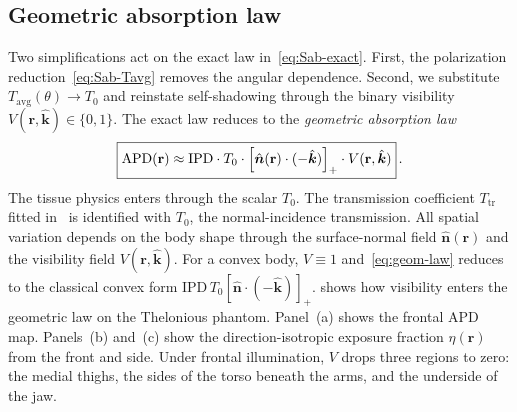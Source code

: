 \documentclass[journal,twocolumn,10pt]{IEEEtran}
\newcommand{\khat}{\hat{\bm{k}}}
\newcommand{\nhat}{\hat{\bm{n}}}
\newcommand{\rr}{\mathbf{r}}
\newcommand{\IPD}{\mathrm{IPD}}
\newcommand{\APD}{\mathrm{APD}}
\newcommand{\Tavg}{T_{\mathrm{avg}}}
\newcommand{\pospart}[1]{\left[#1\right]_{+}}
\newcommand{\Vis}{V}
\begin{document}
\subsection{Geometric absorption law}\label{subsec:pB-geom}

Two simplifications act on the exact law in~\eqref{eq:Sab-exact}.
First, the polarization reduction~\eqref{eq:Sab-Tavg} removes the
angular dependence. Second, we substitute $\Tavg(\theta) \to T_0$ and reinstate
self-shadowing through the binary visibility
$\Vis(\rr,\khat) \in \{0,1\}$. The exact law reduces to the
\textit{geometric absorption law}
\begin{equation}\label{eq:geom-law}
  \boxed{%
    \APD(\rr) \approx \IPD \cdot T_0 \cdot \pospart{\nhat(\rr) \cdot (-\khat)} \cdot
    \Vis(\rr,\khat)
  }\, .
\end{equation}
The tissue physics enters through the scalar $T_0$. The transmission
coefficient $T_{\mathrm{tr}}$ fitted
in~\cite{Kodera2024,Diao2024,Funahashi2018} is identified with $T_0$,
the normal-incidence transmission. All spatial
variation depends on the body shape through the surface-normal field
$\nhat(\rr)$ and the visibility field $\Vis(\rr,\khat)$. For a convex
body, $\Vis \equiv 1$ and~\eqref{eq:geom-law} reduces to the classical
convex form $\IPD\,T_0 \pospart{\nhat\cdot(-\khat)}$.
 shows how visibility enters the geometric law on
the Thelonious phantom. Panel~(a) shows the frontal APD map.
Panels~(b) and~(c) show the direction-isotropic exposure fraction
$\eta(\rr)$ from the front and side. Under frontal illumination,
$\Vis$ drops three regions to zero: the medial thighs, the sides of
the torso beneath the arms, and the underside of the jaw.
\end{document}
